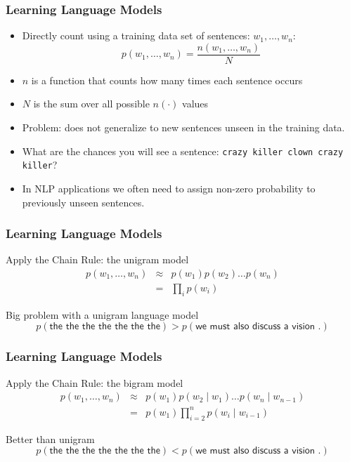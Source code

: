 \begin{frame}
\frametitle{Learning Language Models}
\begin{itemize}[<+->]
\item Directly count using a training data set of sentences: $w_1, \ldots, w_n$:
\[ p(w_1, \ldots, w_n) = \frac{n(w_1, \ldots, w_n)}{N} \]
\item $n$ is a function that counts how many times each sentence occurs
\item $N$ is the sum over all possible $n(\cdot)$ values
\item Problem: does not generalize to new sentences unseen in the training data.
\item What are the chances you will see a sentence: \texttt{crazy killer clown crazy killer}?
\item In NLP applications we often need to assign non-zero probability to previously unseen sentences.
\end{itemize}
\end{frame}

\begin{frame}
\frametitle{Learning Language Models}
\begin{block}{Apply the Chain Rule: the unigram model}
\begin{eqnarray*}
p(w_1, \ldots, w_n) &\approx& p(w_1) p(w_2) \ldots p(w_n) \\
&=& \prod_i p(w_i)
\end{eqnarray*}
\end{block}
\pause
\begin{block}{Big problem with a unigram language model}
\[ p(\textsf{the the the the the the the}) > p(\textsf{we must also discuss a vision .}) \]
\end{block}

\end{frame}


\begin{frame}
\frametitle{Learning Language Models}
\begin{block}{Apply the Chain Rule: the bigram model}
\begin{eqnarray*}
p(w_1, \ldots, w_n) &\approx& p(w_1) p(w_2 \mid w_1) \ldots p(w_n \mid w_{n-1}) \\
&=& p(w_1) \prod_{i=2}^n p(w_i \mid w_{i-1})
\end{eqnarray*}
\end{block}
\pause
\begin{block}{Better than unigram}
\[ p(\textsf{the the the the the the the}) < p(\textsf{we must also discuss a vision .}) \]
\end{block}
\end{frame}

